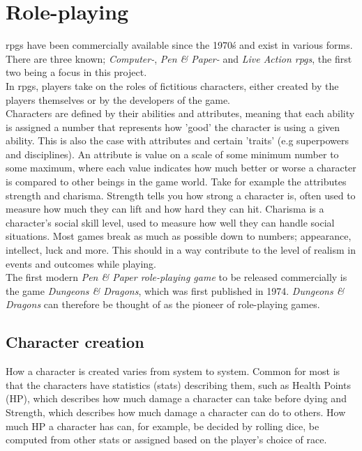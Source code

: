 \section{Role-playing}
\ac{rpgs} have been commercially available since the 1970\'s and exist in various forms.
There are three known; \emph{Computer-}, \emph{Pen \& Paper-} and \emph{Live Action \ac{rpgs}}, the first two being a focus in this project.\\
In \ac{rpgs}, players take on the roles of fictitious characters, either created by the players themselves or by the developers of the game.\\
Characters are defined by their abilities and attributes, meaning that each ability is assigned a number that represents how 'good' the character is using a given ability. This is also the case with attributes and certain 'traits' (e.g superpowers and disciplines). An attribute is value on a scale of some minimum number to some maximum, where each value indicates how much better or worse a character is compared to other beings in the game world. Take for example the attributes strength and charisma. Strength tells you how strong a character is, often used to measure how much they can lift and how hard they can hit. Charisma is a character's social skill level, used to measure how well they can handle social situations. Most games break as much as possible down to numbers; appearance, intellect, luck and more.
This should in a way contribute to the level of realism in events and outcomes while playing.\\
The first modern \emph{Pen \& Paper role-playing game} to be released commercially is the game \emph{Dungeons \& Dragons}, which was first published in 1974.\cite{wikidnd}
\emph{Dungeons \& Dragons} can therefore be thought of as the pioneer of role-playing games.

\subsection{Character creation}

How a character is created varies from system to system. Common for most is that the characters have statistics (stats) describing them, such as Health Points (HP), which describes how much damage a character can take before dying and Strength, which describes how much damage a character can do to others. How much HP a character has can, for example, be decided by rolling dice, be computed from other stats or assigned based on the player's choice of race.

